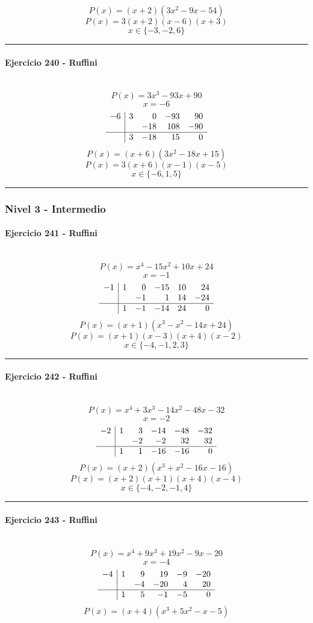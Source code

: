 \documentclass[10pt,a4paper]{article}
\newcommand{\res}[1]{\paragraph{#1}\mbox{}\\[-1.2em]}
\begin{document}
\[ P(x)=(x+2)(3 x^{2} - 9 x - 54) \]
\[ P(x)=3(x+2)(x-6)(x+3) \]
\[ \boxed{x\in\{-3,-2,6\}} \]
\vspace{1mm}\hrule\vspace{2mm}
\res{Ejercicio 240 - Ruffini}
\[ P(x)=3 x^{3} - 93 x + 90 \]
\[ x=-6 \]
\[\begin{array}{r|rrrr}-6 & 3 & 0 & -93 & 90\\  &  & -18 & 108 & -90\\\hline  & 3 & -18 & 15 & 0\end{array}\]
\[ P(x)=(x+6)(3 x^{2} - 18 x + 15) \]
\[ P(x)=3(x+6)(x-1)(x-5) \]
\[ \boxed{x\in\{-6,1,5\}} \]
\vspace{1mm}\hrule\vspace{2mm}
\subsubsection*{Nivel 3 - Intermedio}
\res{Ejercicio 241 - Ruffini}
\[ P(x)=x^{4} - 15 x^{2} + 10 x + 24 \]
\[ x=-1 \]
\[\begin{array}{r|rrrrr}-1 & 1 & 0 & -15 & 10 & 24\\  &  & -1 & 1 & 14 & -24\\\hline  & 1 & -1 & -14 & 24 & 0\end{array}\]
\[ P(x)=(x+1)(x^{3} - x^{2} - 14 x + 24) \]
\[ P(x)=(x+1)(x-3)(x+4)(x-2) \]
\[ \boxed{x\in\{-4,-1,2,3\}} \]
\vspace{1mm}\hrule\vspace{2mm}
\res{Ejercicio 242 - Ruffini}
\[ P(x)=x^{4} + 3 x^{3} - 14 x^{2} - 48 x - 32 \]
\[ x=-2 \]
\[\begin{array}{r|rrrrr}-2 & 1 & 3 & -14 & -48 & -32\\  &  & -2 & -2 & 32 & 32\\\hline  & 1 & 1 & -16 & -16 & 0\end{array}\]
\[ P(x)=(x+2)(x^{3} + x^{2} - 16 x - 16) \]
\[ P(x)=(x+2)(x+1)(x+4)(x-4) \]
\[ \boxed{x\in\{-4,-2,-1,4\}} \]
\vspace{1mm}\hrule\vspace{2mm}
\res{Ejercicio 243 - Ruffini}
\[ P(x)=x^{4} + 9 x^{3} + 19 x^{2} - 9 x - 20 \]
\[ x=-4 \]
\[\begin{array}{r|rrrrr}-4 & 1 & 9 & 19 & -9 & -20\\  &  & -4 & -20 & 4 & 20\\\hline  & 1 & 5 & -1 & -5 & 0\end{array}\]
\[ P(x)=(x+4)(x^{3} + 5 x^{2} - x - 5) \]
\end{document}

